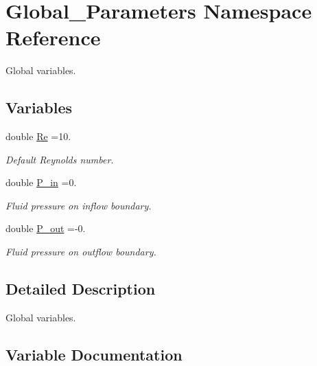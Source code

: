 \hypertarget{namespaceGlobal__Parameters}{}\section{Global\+\_\+\+Parameters Namespace Reference}
\label{namespaceGlobal__Parameters}


Global variables.  


\subsection*{Variables}
\begin{DoxyCompactItemize}
\item 
double \hyperlink{namespaceGlobal__Parameters_a9d72e94a9305c6a310940a6a427ebe06}{Re} =10.
\begin{DoxyCompactList}\small\item\em Default Reynolds number. \end{DoxyCompactList}\item 
double \hyperlink{namespaceGlobal__Parameters_a05b26d00935600b5e0149872844f224c}{P\+\_\+in} =0.
\begin{DoxyCompactList}\small\item\em Fluid pressure on inflow boundary. \end{DoxyCompactList}\item 
double \hyperlink{namespaceGlobal__Parameters_ac680ed856897793d54c9c867da19169c}{P\+\_\+out} =-\/0.
\begin{DoxyCompactList}\small\item\em Fluid pressure on outflow boundary. \end{DoxyCompactList}\end{DoxyCompactItemize}


\subsection{Detailed Description}
Global variables. 

\subsection{Variable Documentation}
\mbox{\label{namespaceGlobal__Parameters_a05b26d00935600b5e0149872844f224c}} 
